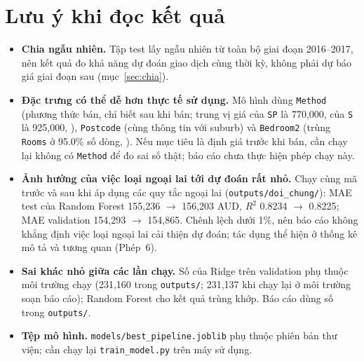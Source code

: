\section{Lưu ý khi đọc kết quả}\label{sec:luuy}
\begin{itemize}[nosep]
  \item \textbf{Chia ngẫu nhiên.} Tập test lấy ngẫu nhiên từ toàn bộ giai đoạn 2016--2017, nên kết quả đo khả năng dự đoán giao dịch cùng thời kỳ, không phải dự báo giá giai đoạn sau (mục~\ref{sec:chia}).
  \item \textbf{Đặc trưng có thể dễ hơn thực tế sử dụng.} Mô hình dùng \texttt{Method} (phương thức bán, chỉ biết sau khi bán; trung vị giá của \texttt{SP} là 770,000, của \texttt{S} là 925,000, ), \texttt{Postcode} (cùng thông tin với suburb) và \texttt{Bedroom2} (trùng \texttt{Rooms} ở 95.0\% số dòng, ). Nếu mục tiêu là định giá trước khi bán, cần chạy lại không có \texttt{Method} để đo sai số thật; báo cáo chưa thực hiện phép chạy này.
  \item \textbf{Ảnh hưởng của việc loại ngoại lai tới dự đoán rất nhỏ.} Chạy cùng mã trước và sau khi áp dụng các quy tắc ngoại lai (\texttt{outputs/doi\_chung/}): MAE test của Random Forest 155,236 $\to$ 156,203 AUD, $R^2$ 0.8234 $\to$ 0.8225; MAE validation 154,293 $\to$ 154,865. Chênh lệch dưới 1\%, nên báo cáo không khẳng định việc loại ngoại lai cải thiện dự đoán; tác dụng thể hiện ở thống kê mô tả và tương quan (Phép~6).
  \item \textbf{Sai khác nhỏ giữa các lần chạy.} Số của Ridge trên validation phụ thuộc môi trường chạy (231,160 trong \texttt{outputs/}; 231,137 khi chạy lại ở môi trường soạn báo cáo); Random Forest cho kết quả trùng khớp. Báo cáo dùng số trong \texttt{outputs/}.
  \item \textbf{Tệp mô hình.} \texttt{models/best\_pipeline.joblib} phụ thuộc phiên bản thư viện; cần chạy lại \texttt{train\_model.py} trên máy sử dụng.
\end{itemize}
